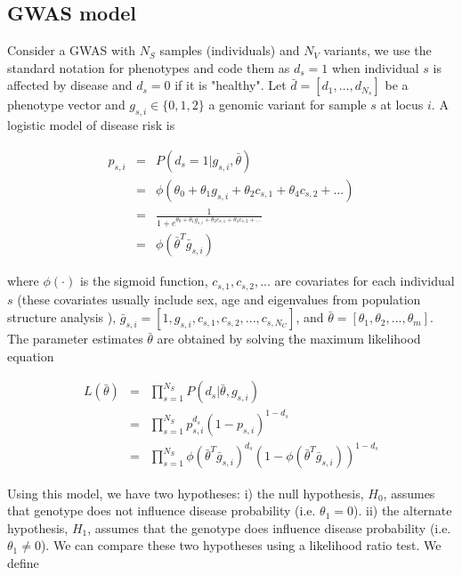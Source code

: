 \subsection{GWAS model}

Consider a GWAS with $N_S$  samples (individuals) and $N_V$ variants, we use the standard notation for phenotypes and code them as $d_s=1$ when individual $s$ is affected by disease and $d_s=0$ if it is "healthy". Let $\bar{d} = [d_1, ..., d_{N_s}]$ be a phenotype vector and $g_{s,i} \in \{0,1,2\}$ a genomic variant for sample $s$ at locus $i$. A logistic model of disease risk \cite{balding2006tutorial} is

\begin{eqnarray*}
    p_{s,i} & = & P( d_s=1 | g_{s,i}, \bar{\theta} ) \\
    & = & \phi( \theta_0 + \theta_1 g_{s,i} + \theta_2 c_{s,1} + \theta_4 c_{s,2} + ... ) \\
    & = & \frac{1}{1 + e^{\theta_0 + \theta_1 g_{s,i} + \theta_2 c_{s,1} + \theta_4 c_{s,2} + ...}} \\
    & = & \phi( \bar{\theta}^T \bar{g}_{s,i})
\end{eqnarray*}

\noindent where $\phi(\cdot)$ is the sigmoid function, $c_{s,1}, c_{s,2}, ... $ are covariates for each individual $s$ (these covariates usually include sex, age and eigenvalues from population structure analysis \cite{price2006principal}), $\bar{g}_{s,i} = [ 1, g_{s,i} , c_{s,1}, c_{s,2}, ... , c_{s,N_C} ]$, and $\bar{\theta} = [\theta_1, \theta_2, ..., \theta_m] $. The parameter estimates $\bar{\theta}$ are obtained by solving the maximum likelihood equation

\begin{eqnarray*}
    L( \bar{\theta} ) & = & \prod_{s=1}^{N_S}{ P( d_s | \bar{\theta}, g_{s,i} ) } \\
    & = & \prod_{s=1}^{N_S}{ p_{s,i}^{d_s} (1-p_{s,i})^{1-d_s} } \\
    & = & \prod_{s=1}^{N_S}{ \phi( \bar{\theta}^T \bar{g}_{s,i})^{d_s} (1-\phi( \bar{\theta}^T \bar{g}_{s,i}))^{1-d_s} }
\end{eqnarray*}

Using this model, we have two hypotheses: i) the null hypothesis, $H_0$, assumes that genotype does not influence disease probability (i.e. $\theta_1 = 0$). ii) the alternate hypothesis, $H_1$, assumes that the genotype does influence disease probability (i.e. $\theta_1 \neq 0$). We can compare these two hypotheses using a likelihood ratio test. We define

